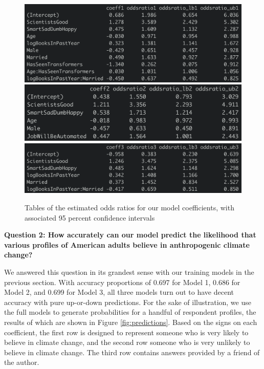 \begin{figure}[h]
    \centering
    \includegraphics[scale=.5]{oddsratios_1.png}\vspace{.2in}
    \includegraphics[scale=.5]{oddsratios_2.png}\vspace{.2in}
    \includegraphics[scale=.5]{oddsratios_3.png}
    \caption{Tables of the estimated odds ratios for our model coefficients, with associated 95 percent confidence intervals}
    \label{fig:oddsratio_tables}
\end{figure}

\newpage

\bigskip \textbf{Question 2: How accurately can our model predict the likelihood that various profiles of American adults believe in anthropogenic climate change?}

\par \bigskip We answered this question in its grandest sense with our training models in the previous section. With accuracy proportions of 0.697 for Model 1, 0.686 for Model 2, and 0.699 for Model 3, all three models turn out to have decent accuracy with pure up-or-down predictions. For the sake of illustration, we use the full models to generate probabilities for a handful of respondent profiles, the results of which are shown in Figure \ref{fig:predictions}. Based on the signs on each coefficient, the first row is designed to represent someone who is very likely to believe in climate change, and the second row someone who is very unlikely to believe in climate change. The third row contains answers provided by a friend of the author.

